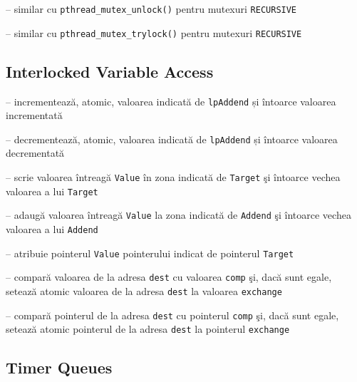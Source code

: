 \documentclass{refcard.cs.pub.ro}
\begin{document}
\begin{multicols*}{3}
 -- similar cu \texttt{pthread_mutex_unlock()} pentru mutexuri \texttt{RECURSIVE}

 -- similar cu \texttt{pthread_mutex_trylock()} pentru mutexuri \texttt{RECURSIVE}
\begin{params}
  \param{}{}
\end{params}

\subsection{Interlocked Variable Access}

 -- incrementează, atomic, valoarea indicată de \texttt{lpAddend} și întoarce valoarea incrementată

 -- decrementează, atomic, valoarea indicată de \texttt{lpAddend} și întoarce valoarea decrementată

 -- scrie valoarea întreagă \texttt{Value} în zona indicată de \texttt{Target} şi întoarce vechea valoarea a lui \texttt{Target}

 -- adaugă valoarea întreagă \texttt{Value} la zona indicată de \texttt{Addend} şi întoarce vechea valoarea a lui \texttt{Addend}

 -- atribuie pointerul \texttt{Value} pointerului indicat de pointerul \texttt{Target}

 -- compară valoarea de la adresa \texttt{dest} cu valoarea \texttt{comp} şi, dacă sunt egale, setează atomic valoarea de la adresa \texttt{dest} la valoarea \texttt{exchange}

 -- compară pointerul de la adresa \texttt{dest} cu pointerul \texttt{comp} şi, dacă sunt egale, setează atomic pointerul de la adresa \texttt{dest} la pointerul \texttt{exchange}

\subsection{Timer Queues}


\end{multicols*}
\end{document}

